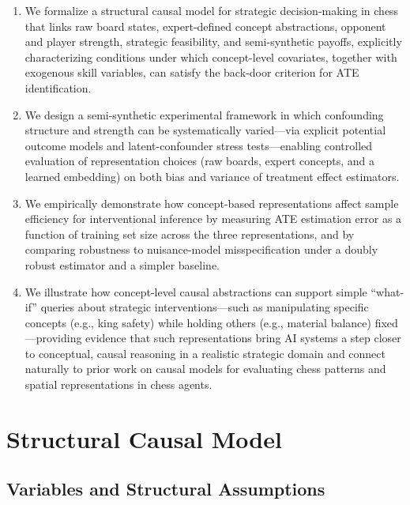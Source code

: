 \documentclass[11pt]{article}
\begin{document}
\begin{enumerate}
\item We formalize a structural causal model for strategic decision-making in chess that links raw board states, expert-defined concept abstractions, opponent and player strength, strategic feasibility, and semi-synthetic payoffs, explicitly characterizing conditions under which concept-level covariates, together with exogenous skill variables, can satisfy the back-door criterion for ATE identification.\cite{pearl2009causality,lemeire2005causalmodelsinchess}
\item We design a semi-synthetic experimental framework in which confounding structure and strength can be systematically varied---via explicit potential outcome models and latent-confounder stress tests---enabling controlled evaluation of representation choices (raw boards, expert concepts, and a learned embedding) on both bias and variance of treatment effect estimators.\cite{hill2011bayesian,kuang2020information,deconfoundingScores}
\item We empirically demonstrate how concept-based representations affect sample efficiency for interventional inference by measuring ATE estimation error as a function of training set size across the three representations, and by comparing robustness to nuisance-model misspecification under a doubly robust estimator and a simpler baseline.\cite{chernozhukov2018double,kuang2020information,scholkopf2021towards}
\item We illustrate how concept-level causal abstractions can support simple ``what-if'' queries about strategic interventions---such as manipulating specific concepts (e.g., king safety) while holding others (e.g., material balance) fixed---providing evidence that such representations bring AI systems a step closer to conceptual, causal reasoning in a realistic strategic domain and connect naturally to prior work on causal models for evaluating chess patterns and spatial representations in chess agents.\cite{lemeire2005causalmodelsinchess,fortressesPaper,causalMaskingSpatial}
\end{enumerate}

\section*{Structural Causal Model}

\subsection*{Variables and Structural Assumptions}
\end{document}
